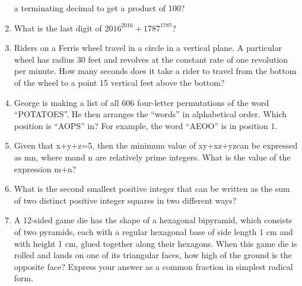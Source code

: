 \documentclass[12pt]{article}
\begin{document}
\begin{enumerate}
a terminating decimal to get a product of 100?
\bigskip
\item What is the last digit of $2016^{2016} + 1787^{1787}$?
\bigskip
\item Riders on a Ferris wheel travel in a circle in a vertical plane.
A particular wheel has radius 30 feet and revolves at the constant rate of
one revolution per minute. How many seconds does it take a rider to travel
from the bottom of the wheel to a point 15 vertical feet above the bottom?
\bigskip
\item George is making a list of all 606 four-letter permutations of the word “POTATOES”.
He then arranges the “words” in alphabetical order. Which position  is “AOPS” in?
For example, the word “AEOO” is in position 1.
\bigskip
\item  Given that
x+y+z=5, then the minimum value of xy+xz+yzcan be expressed as mn,
where mand n are relatively prime integers. What is the value of the expression m+n?
\bigskip
\item What is the second smallest positive integer that can be written as the sum of two
distinct positive integer squares in two different ways?
\bigskip
\item A 12-sided game die has the shape of a hexagonal bipyramid, which consists of
two pyramids, each with a regular hexagonal base of side length 1 cm and with
height 1 cm, glued together along their hexagons. When this game die is rolled
and lands on one of its triangular faces, how high of the ground is the opposite
face? Express your answer as a common fraction in simplest radical form.


\end{enumerate}
\end{document}

